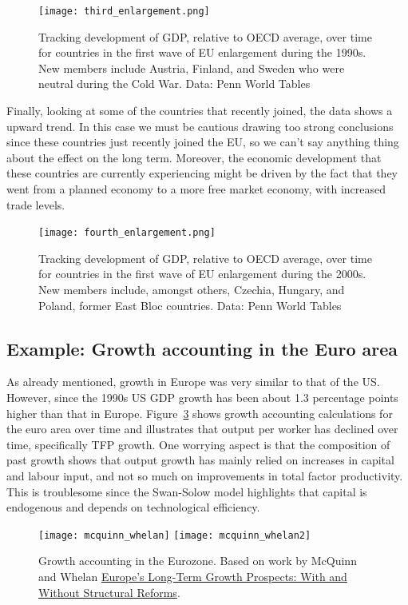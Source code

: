 \documentclass{tufte-handout}
\begin{document}
\begin{figure} \centering
    \texttt{[image: third\_enlargement.png]}
    \caption{Tracking development of GDP, relative to OECD average, over time for countries in the first wave of EU enlargement during the 1990s. New members include Austria, Finland, and Sweden who were neutral during the Cold War. Data: Penn World Tables}
    \label{fig:enlargement3}
  \end{figure}
Finally, looking at some of the countries that recently joined, the data shows a upward trend. 
In this case we must be cautious drawing too strong conclusions since these countries just recently joined the EU, so we can't say anything thing about the effect on the long term. 
Moreover, the economic development that these countries are currently experiencing might be driven by the fact that they went from a planned economy to a more free market economy, with increased trade levels. 
\begin{figure} \centering
    \texttt{[image: fourth\_enlargement.png]}
    \caption{Tracking development of GDP, relative to OECD average, over time for countries in the first wave of EU enlargement during the 2000s. New members include, amongst others, Czechia, Hungary, and Poland, former East Bloc countries. Data: Penn World Tables}
    \label{fig:enlargement4}
  \end{figure}
\clearpage
\subsection{Example: Growth accounting in the Euro area}
As already mentioned, growth in Europe was very similar to that of the US. 
However, since the 1990s US GDP growth has been about 1.3 percentage points higher than that in Europe. 
Figure~\ref{fig:euro} shows growth accounting calculations for the euro area over time and illustrates that output per worker has declined over time, specifically TFP growth.
One worrying aspect is that the composition of past growth shows that output growth has mainly relied on increases in capital and labour input, and not so much on improvements in total factor productivity. 
This is troublesome since the Swan-Solow model highlights that capital is endogenous and depends on technological efficiency. 
\begin{figure}
  \texttt{[image: mcquinn\_whelan]}
  \texttt{[image: mcquinn\_whelan2]}
  \label{fig:euro}
  \caption{Growth accounting in the Eurozone. Based on work by McQuinn and Whelan \href{http://www.karlwhelan.com/Papers/McQuinnWhelanMarch2015.pdf}{Europe's Long-Term Growth Prospects: With and Without Structural Reforms}.}
\end{figure}
\end{document}
